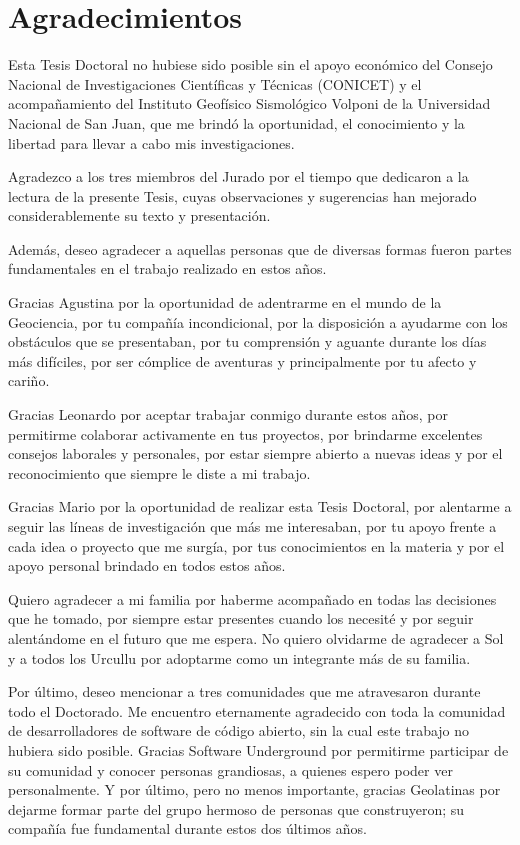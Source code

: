 \chapter*{Agradecimientos}

Esta Tesis Doctoral no hubiese sido posible sin el apoyo económico del Consejo
Nacional de Investigaciones Científicas y Técnicas (CONICET) y el
acompañamiento del Instituto Geofísico Sismológico Volponi de la Universidad
Nacional de San Juan, que me brindó la oportunidad, el conocimiento y la
libertad para llevar a cabo mis investigaciones.

Agradezco a los tres miembros del Jurado por el tiempo que dedicaron a la
lectura de la presente Tesis, cuyas observaciones y sugerencias han mejorado
considerablemente su texto y presentación.

Además, deseo agradecer a aquellas personas que de diversas formas fueron
partes fundamentales en el trabajo realizado en estos años.

Gracias Agustina por la oportunidad de adentrarme en el mundo de la Geociencia,
por tu compañía incondicional, por la disposición a ayudarme con los obstáculos
que se presentaban, por tu comprensión y aguante durante los días más
difíciles, por ser cómplice de aventuras y principalmente por tu afecto
y cariño.

Gracias Leonardo por aceptar trabajar conmigo durante estos años, por
permitirme colaborar activamente en tus proyectos, por brindarme excelentes
consejos laborales y personales, por estar siempre abierto a nuevas ideas y por
el reconocimiento que siempre le diste a mi trabajo.

Gracias Mario por la oportunidad de realizar esta Tesis Doctoral, por alentarme
a seguir las líneas de investigación que más me interesaban, por tu apoyo
frente a cada idea o proyecto que me surgía, por tus conocimientos en la
materia y por el apoyo personal brindado en todos estos años.

Quiero agradecer a mi familia por haberme acompañado en todas las decisiones
que he tomado, por siempre estar presentes cuando los necesité y por seguir
alentándome en el futuro que me espera.
No quiero olvidarme de agradecer a Sol y a todos los Urcullu por adoptarme como
un integrante más de su familia.

Por último, deseo mencionar a tres comunidades que me atravesaron durante todo
el Doctorado.
Me encuentro eternamente agradecido con toda la comunidad de desarrolladores de
software de código abierto, sin la cual este trabajo no hubiera sido posible.
Gracias Software Underground por permitirme participar de su comunidad
y conocer personas grandiosas, a quienes espero poder ver personalmente.
Y por último, pero no menos importante, gracias Geolatinas por dejarme formar
parte del grupo hermoso de personas que construyeron; su compañía fue
fundamental durante estos dos últimos años.
